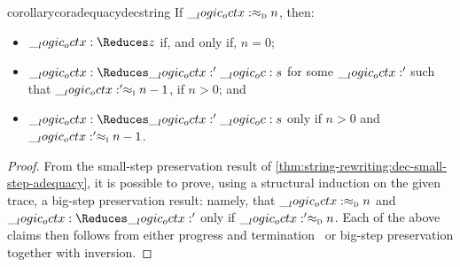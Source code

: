 \begin{restatable}[
  name=Big-step adequacy of decrements,
  label=cor:string-rewriting:dec-big-step-adequacy
]{corollary}{coradequacydecstring}
  If $\__logic_octx: \approx\sb{\text{\normalfont\scshape d}} n$, then:
  \begin{itemize}[nosep]
  \item $\octx \Reduces z$ if, and only if, $n = 0$;
  \item $\octx \Reduces \octx' \oc s$ for some $\__logic_octx:'$ such that $\__logic_octx:' \approx\sb{\text{\normalfont\scshape i}} n-1$, if $n > 0$; and
  \item $\octx \Reduces \octx' \oc s$ only if $n > 0$ and $\__logic_octx:' \approx\sb{\text{\normalfont\scshape i}} n-1$.
  \end{itemize}
\end{restatable}
\begin{proof}
  From the small-step preservation result of \cref{thm:string-rewriting:dec-small-step-adequacy}, it is possible to prove, using a structural induction on the given trace, a big-step preservation result: namely, that $\__logic_octx: \approx\sb{\text{\normalfont\scshape d}} n$ and $\octx \Reduces \octx'$ only if $\__logic_octx:' \approx\sb{\text{\normalfont\scshape d}} n$.
  Each of the above claims then follows from either progress and termination~ or big-step preservation together with inversion.
\end{proof}

% 

